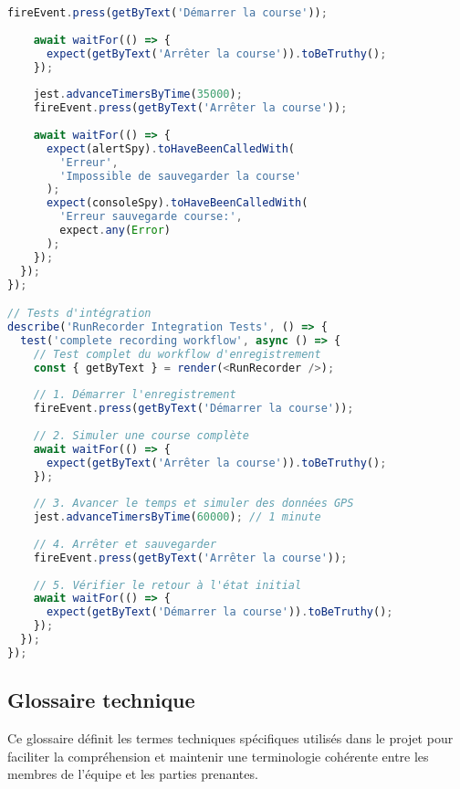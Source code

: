 \begin{lstlisting}[language=javascript, caption=Tests React Native avec Jest et React Native Testing Library]
    fireEvent.press(getByText('Démarrer la course'));
    
    await waitFor(() => {
      expect(getByText('Arrêter la course')).toBeTruthy();
    });
    
    jest.advanceTimersByTime(35000);
    fireEvent.press(getByText('Arrêter la course'));
    
    await waitFor(() => {
      expect(alertSpy).toHaveBeenCalledWith(
        'Erreur',
        'Impossible de sauvegarder la course'
      );
      expect(consoleSpy).toHaveBeenCalledWith(
        'Erreur sauvegarde course:',
        expect.any(Error)
      );
    });
  });
});

// Tests d'intégration
describe('RunRecorder Integration Tests', () => {
  test('complete recording workflow', async () => {
    // Test complet du workflow d'enregistrement
    const { getByText } = render(<RunRecorder />);
    
    // 1. Démarrer l'enregistrement
    fireEvent.press(getByText('Démarrer la course'));
    
    // 2. Simuler une course complète
    await waitFor(() => {
      expect(getByText('Arrêter la course')).toBeTruthy();
    });
    
    // 3. Avancer le temps et simuler des données GPS
    jest.advanceTimersByTime(60000); // 1 minute
    
    // 4. Arrêter et sauvegarder
    fireEvent.press(getByText('Arrêter la course'));
    
    // 5. Vérifier le retour à l'état initial
    await waitFor(() => {
      expect(getByText('Démarrer la course')).toBeTruthy();
    });
  });
});
\end{lstlisting}

\subsection{Glossaire technique}

Ce glossaire définit les termes techniques spécifiques utilisés dans le projet pour faciliter la compréhension et maintenir une terminologie cohérente entre les membres de l'équipe et les parties prenantes.

